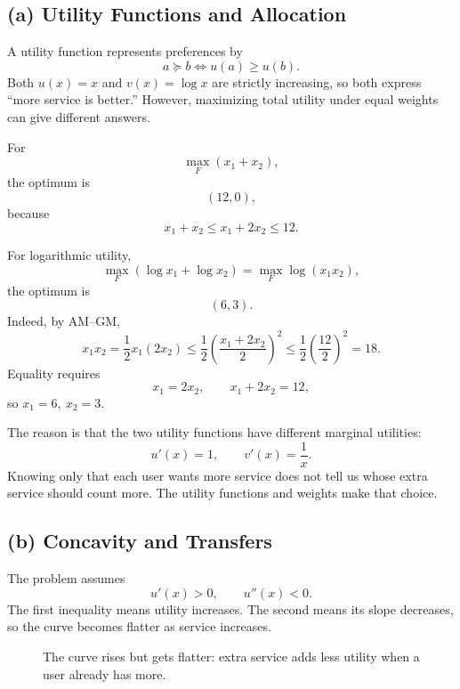 \documentclass[11pt,a4paper]{article}
\begin{document}
\subsection*{(a) Utility Functions and Allocation}

A utility function represents preferences by
\[
a\succeq b \iff u(a)\ge u(b).
\]
Both \(u(x)=x\) and \(v(x)=\log x\) are strictly increasing, so both express
``more service is better.'' However, maximizing total utility under equal
weights can give different answers.

For
\[
\max_F (x_1+x_2),
\]
the optimum is
\[
(12,0),
\]
because
\[
x_1+x_2\le x_1+2x_2\le 12.
\]

For logarithmic utility,
\[
\max_F(\log x_1+\log x_2)=\max_F \log(x_1x_2),
\]
the optimum is
\[
(6,3).
\]
Indeed, by AM--GM,
\[
x_1x_2=\frac12 x_1(2x_2)
\le \frac12\left(\frac{x_1+2x_2}{2}\right)^2
\le \frac12\left(\frac{12}{2}\right)^2=18.
\]
Equality requires
\[
x_1=2x_2,\qquad x_1+2x_2=12,
\]
so \(x_1=6,\ x_2=3\).

The reason is that the two utility functions have different marginal
utilities:
\[
u'(x)=1,\qquad v'(x)=\frac1x.
\]
Knowing only that each user wants more service does not tell us whose extra
service should count more. The utility functions and weights make that choice.

\subsection*{(b) Concavity and Transfers}

The problem assumes
\[
u'(x)>0,\qquad u''(x)<0.
\]
The first inequality means utility increases. The second means its slope
decreases, so the curve becomes flatter as service increases.

\begin{figure}[htbp]
\centering
{}
\caption{The curve rises but gets flatter: extra service adds less utility
when a user already has more.}
\label{fig:utility}
\end{figure}
\end{document}
